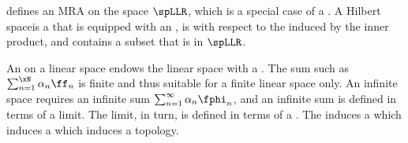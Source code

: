  defines an MRA on the space $\spLLR$, which is a special case of a .
A Hilbert spaceis a that is
equipped with an ,
is with respect to the
induced by the inner product,
and contains a subset that is in $\spLLR$.

An  on a linear space endows the linear space with a .
The sum such as $\sum_{n=1}^\xN \alpha_n \ff_n$ is finite and thus suitable for a finite linear space only.
An infinite space requires an infinite sum $\sum_{n=1}^\infty \alpha_n \fphi_n$, and an infinite sum is defined
in terms of a limit.
The limit, in turn, is defined in terms of a .
The  induces a   which induces a
 which induces a topology.


%



